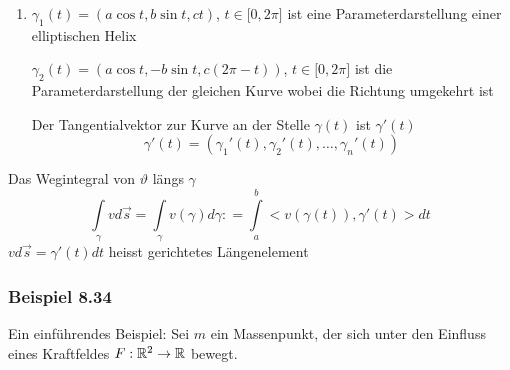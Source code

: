 \begin{enumerate}
\begin{figure}[H]
\begin{minipage}[b]{0.45\linewidth}
\end{minipage}
\end{figure}
\item $\gamma_1 (t)=\left( a\cos t,b\sin t, ct\right)$, $t\in\lbrack 0,2\pi\rbrack$ ist eine Parameterdarstellung einer elliptischen Helix
\begin{center}
\end{center}
$\gamma_2 (t)=\left( a\cos t,-b\sin t, c(2\pi -t)\right)$, $t\in\lbrack 0,2\pi\rbrack$ ist die Parameterdarstellung der gleichen Kurve wobei die Richtung umgekehrt ist

\begin{center}
\end{center}

Der Tangentialvektor zur Kurve an der Stelle $\gamma (t)$ ist $\gamma' (t)$ \[\gamma'(t)=\left( \gamma_1'(t),\gamma_2'(t),\dots, \gamma_n'(t)\right)\]
\end{enumerate}

\begin{definition}{8.33}
Das Wegintegral von $\vartheta$ längs $\gamma$
\[\int\limits_\gamma  {vd\vec s}  = \int\limits_\gamma  {v(\gamma )d\gamma : = \int\limits_a^b { < v\left( {\gamma \left( t \right)} \right),\gamma '(t) > dt} } \] ${vd\vec s}=\gamma'(t)dt$ heisst gerichtetes Längenelement
\end{definition}
\subsubsection*{Beispiel 8.34}
Ein einführendes Beispiel: Sei $m$ ein Massenpunkt, der sich unter den Einfluss eines Kraftfeldes $F:\mathbb{R}^2\to\mathbb{R}$ bewegt.\\

